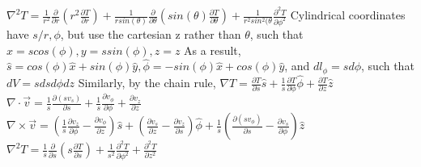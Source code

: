 \documentclass[11 pt, twoside]{article}
\newenvironment{outline*}
{
	\begin{outline}[enumerate]
	}
	{\end{outline}
}
\begin{document}
\begin{outline*}
		\3 $\nabla^2 T = \frac{1}{r^2}\frac{\partial}{\partial r}(r^2\frac{\partial T}{\partial r}) + \frac{1}{rsin(\theta)}\frac{\partial}{\partial \theta}(sin(\theta)\frac{\partial T}{\partial \theta}) + \frac{1}{r^2sin^2(\theta}\frac{\partial^2 T}{\partial \phi^2}$
\1 Cylindrical coordinates have $s/r, \phi$, but use the cartesian z rather than $\theta$, such that $x = scos(\phi), y = ssin(\phi), z = z$
	\2 As a result, $\hat{s} = cos(\phi)\hat{x} + sin(\phi)\hat{y}, \hat{\phi} = -sin(\phi)\hat{x} + cos(\phi)\hat{y}$, and $dl_{\phi} = sd\phi$, such that $dV = sdsd\phi dz$
	\2 Similarly, by the chain rule, $\nabla T = \frac{\partial T}{\partial s}\hat{s} + \frac{1}{s}\frac{\partial T}{\partial \phi}\hat{\phi} + \frac{\partial T}{\partial z}\hat{z}$
		\3 $\nabla \cdot \vec{v} = \frac{1}{s}\frac{\partial(sv_s)}{\partial s} + \frac{1}{s}\frac{\partial v_{\phi}}{\partial \phi} + \frac{\partial v_z}{\partial z}$
		\3 $\nabla \times \vec{v} = (\frac{1}{s}\frac{\partial v_{z}}{\partial \phi} - \frac{\partial v_{\phi}}{\partial z})\hat{s} + (\frac{\partial v_s}{\partial z} - \frac{\partial v_z}{\partial s})\hat{\phi} + \frac{1}{s}(\frac{\partial(sv_{\phi})}{\partial s} - \frac{\partial v_s}{\partial \phi})\hat{z}$
		\3 $\nabla^2 T = \frac{1}{s}\frac{\partial}{\partial s}(s\frac{\partial T}{\partial s}) + \frac{1}{s^2}\frac{\partial^2 T}{\partial \phi^2} + \frac{\partial^2 T}{\partial z^2}$
\end{outline*}
\end{document}
